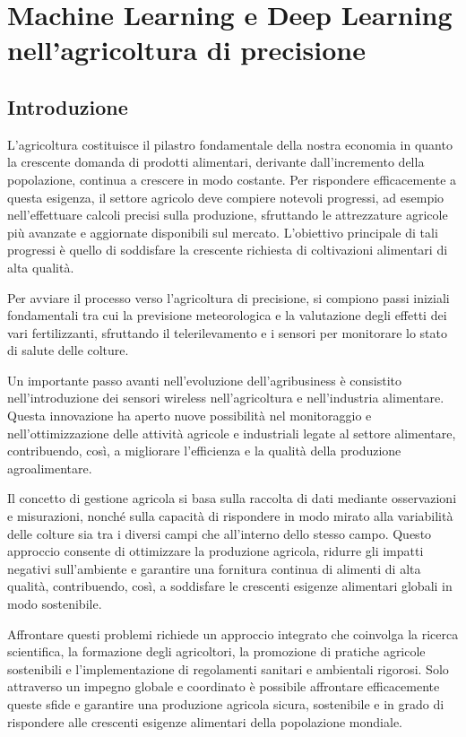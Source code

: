\section{Machine Learning e Deep Learning nell’agricoltura di precisione}
\subsection{Introduzione}

L'agricoltura costituisce il pilastro fondamentale della nostra economia in quanto la crescente domanda di prodotti alimentari, derivante dall'incremento della popolazione, continua a crescere in modo costante. Per rispondere efficacemente a questa esigenza, il settore agricolo deve compiere notevoli progressi, ad esempio nell'effettuare calcoli precisi sulla produzione, sfruttando le attrezzature agricole più avanzate e aggiornate disponibili sul mercato. L'obiettivo principale di tali progressi è quello di soddisfare la crescente richiesta di coltivazioni alimentari di alta qualità.

Per avviare il processo verso l'agricoltura di precisione, si compiono passi iniziali fondamentali tra cui la previsione meteorologica e la valutazione degli effetti dei vari fertilizzanti, sfruttando il telerilevamento e i sensori per monitorare lo stato di salute delle colture.

Un importante passo avanti nell'evoluzione dell'agribusiness è consistito nell'introduzione dei sensori wireless nell'agricoltura e nell'industria alimentare. Questa innovazione ha aperto nuove possibilità nel monitoraggio e nell'ottimizzazione delle attività agricole e industriali legate al settore alimentare, contribuendo, così, a migliorare l'efficienza e la qualità della produzione agroalimentare.

Il concetto di gestione agricola si basa sulla raccolta di dati mediante osservazioni e misurazioni, nonché sulla capacità di rispondere in modo mirato alla variabilità delle colture sia tra i diversi campi che all'interno dello stesso campo. Questo approccio consente di ottimizzare la produzione agricola, ridurre gli impatti negativi sull'ambiente e garantire una fornitura continua di alimenti di alta qualità, contribuendo, così, a soddisfare le crescenti esigenze alimentari globali in modo sostenibile.

Affrontare questi problemi richiede un approccio integrato che coinvolga la ricerca scientifica, la formazione degli agricoltori, la promozione di pratiche agricole sostenibili e l'implementazione di regolamenti sanitari e ambientali rigorosi. Solo attraverso un impegno globale e coordinato è possibile affrontare efficacemente queste sfide e garantire una produzione agricola sicura, sostenibile e in grado di rispondere alle crescenti esigenze alimentari della popolazione mondiale.

